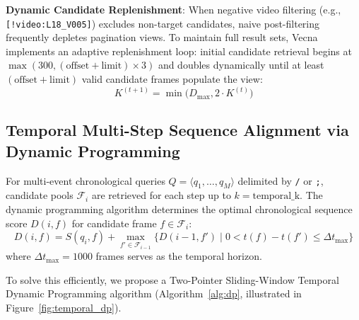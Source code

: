 \textbf{Dynamic Candidate Replenishment}: When negative video filtering (e.g., \texttt{[!video:L18\_V005]}) excludes non-target candidates, naive post-filtering frequently depletes pagination views. To maintain full result sets, Vecna implements an adaptive replenishment loop: initial candidate retrieval begins at $\max(300, (\text{offset} + \text{limit}) \times 3)$ and doubles dynamically until at least $(\text{offset} + \text{limit})$ valid candidate frames populate the view:
\begin{equation}
K^{(t+1)} = \min\big(D_{\max}, 2 \cdot K^{(t)}\big)
\end{equation}

\subsection{Temporal Multi-Step Sequence Alignment via Dynamic Programming}\label{sec:temporal}

For multi-event chronological queries $Q = \langle q_1, \dots, q_M \rangle$ delimited by \texttt{/} or \texttt{;}, candidate pools $\mathcal{F}_i$ are retrieved for each step up to $k = \text{temporal\_k}$. The dynamic programming algorithm determines the optimal chronological sequence score $D(i, f)$ for candidate frame $f \in \mathcal{F}_i$:
\begin{equation}
D(i, f) = S(q_i, f) + \max_{f' \in \mathcal{F}_{i-1}} \Big\{ D(i-1, f') \;\Big|\; 0 < t(f) - t(f') \le \Delta t_{\max} \Big\}
\end{equation}
where $\Delta t_{\max} = 1000$ frames serves as the temporal horizon.

To solve this efficiently, we propose a Two-Pointer Sliding-Window Temporal Dynamic Programming algorithm (Algorithm~\ref{alg:dp}, illustrated in Figure~\ref{fig:temporal_dp}). 

